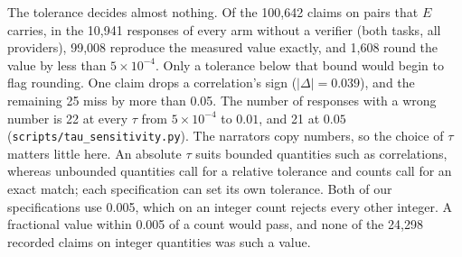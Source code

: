 \documentclass[smallextended,natbib]{svjour3}
\begin{document}
\begin{table}[!htbp]
\caption{Terms used in the rest of the paper.}
\label{tab:terms}
\centering
\footnotesize
\setlength{\tabcolsep}{3pt}
\end{table}

The tolerance decides almost nothing. Of the 100{,}642 claims on pairs that
$E$ carries, in the 10{,}941 responses of every arm without a verifier (both
tasks, all providers), 99{,}008 reproduce the measured value exactly, and
1{,}608 round the value by less than $5\times10^{-4}$. Only a tolerance below
that bound would begin to flag rounding. One claim drops a correlation's sign
($|\Delta| = 0.039$), and the remaining 25 miss by more than 0.05. The number
of responses with a wrong number is 22 at every $\tau$ from $5\times10^{-4}$
to $0.01$, and 21 at $0.05$ (\texttt{scripts/tau\_sensitivity.py}). The
narrators copy numbers, so the choice of $\tau$ matters little here. An
absolute $\tau$ suits bounded quantities such as correlations, whereas
unbounded quantities call for a relative tolerance and counts call for an exact
match; each specification can set its own tolerance. Both of our
specifications use 0.005, which on an integer count rejects every other
integer. A fractional value within 0.005 of a count would pass, and none of the
24{,}298 recorded claims on integer quantities was such a value.
\end{document}
